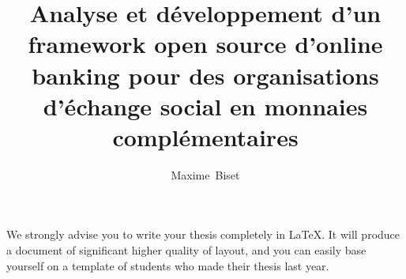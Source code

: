 \documentclass[british]{article}
\title{Analyse et développement d'un framework open source d'online banking pour des organisations d'échange social en monnaies complémentaires}
\author{Maxime~Biset}
\begin{document}
\maketitle

We strongly advise you to write your thesis completely in \LaTeX. It
will produce a document of significant higher quality of layout, and
you can easily base yourself on a template of students who made their
thesis last year.


\end{document}
